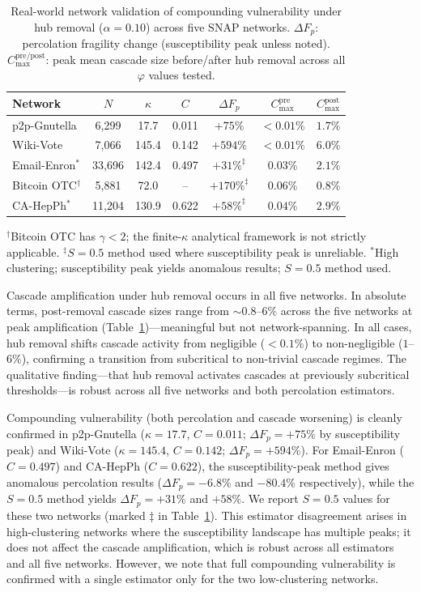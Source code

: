 \documentclass[aps,pre,twocolumn,superscriptaddress,showpacs]{revtex4-2}
\newcommand{\DF}{\Delta F}
\begin{document}
\begin{table}[h]
\caption{Real-world network validation of compounding vulnerability under hub removal ($\alpha=0.10$) across five SNAP networks. $\DF_p$: percolation fragility change (susceptibility peak unless noted). $C_{\max}^{\mathrm{pre/post}}$: peak mean cascade size before/after hub removal across all $\varphi$ values tested.}
\label{tab:realworld}
\begin{ruledtabular}
\begin{tabular}{lcccccc}
Network & $N$ & $\kappa$ & $C$ & $\DF_p$ & $C_{\max}^{\mathrm{pre}}$ & $C_{\max}^{\mathrm{post}}$ \\
\hline
p2p-Gnutella & 6{,}299 & 17.7 & 0.011 & $+75\%$ & $<0.01\%$ & $1.7\%$ \\
Wiki-Vote & 7{,}066 & 145.4 & 0.142 & $+594\%$ & $<0.01\%$ & $6.0\%$ \\
Email-Enron$^*$ & 33{,}696 & 142.4 & 0.497 & $+31\%^\ddag$ & $0.03\%$ & $2.1\%$ \\
Bitcoin OTC$^\dag$ & 5{,}881 & 72.0 & -- & $+170\%^\ddag$ & $0.06\%$ & $0.8\%$ \\
CA-HepPh$^*$ & 11{,}204 & 130.9 & 0.622 & $+58\%^\ddag$ & $0.04\%$ & $2.9\%$ \\
\end{tabular}
\end{ruledtabular}
$^\dag$Bitcoin OTC has $\gamma < 2$; the finite-$\kappa$ analytical framework is not strictly applicable.
$^\ddag$$S=0.5$ method used where susceptibility peak is unreliable.
$^*$High clustering; susceptibility peak yields anomalous results; $S=0.5$ method used.
\end{table}

Cascade amplification under hub removal occurs in all five networks. In absolute terms, post-removal cascade sizes range from ${\sim}0.8$--$6\%$ across the five networks at peak amplification (Table~\ref{tab:realworld})---meaningful but not network-spanning. In all cases, hub removal shifts cascade activity from negligible ($<0.1\%$) to non-negligible ($1$--$6\%$), confirming a transition from subcritical to non-trivial cascade regimes. The qualitative finding---that hub removal activates cascades at previously subcritical thresholds---is robust across all five networks and both percolation estimators.

Compounding vulnerability (both percolation and cascade worsening) is cleanly confirmed in p2p-Gnutella ($\kappa=17.7$, $C=0.011$; $\DF_p=+75\%$ by susceptibility peak) and Wiki-Vote ($\kappa=145.4$, $C=0.142$; $\DF_p=+594\%$). For Email-Enron ($C=0.497$) and CA-HepPh ($C=0.622$), the susceptibility-peak method gives anomalous percolation results ($\DF_p=-6.8\%$ and $-80.4\%$ respectively), while the $S=0.5$ method yields $\DF_p=+31\%$ and $+58\%$. We report $S=0.5$ values for these two networks (marked $\ddag$ in Table~\ref{tab:realworld}). This estimator disagreement arises in high-clustering networks where the susceptibility landscape has multiple peaks; it does not affect the cascade amplification, which is robust across all estimators and all five networks. However, we note that full compounding vulnerability is confirmed with a single estimator only for the two low-clustering networks.
\end{document}

